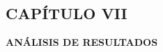 \begin{center}
    \section*{CAPÍTULO VII}
    \vspace*{0.5in}
    \textbf{ANÁLISIS DE RESULTADOS}
\end{center}

\newpage